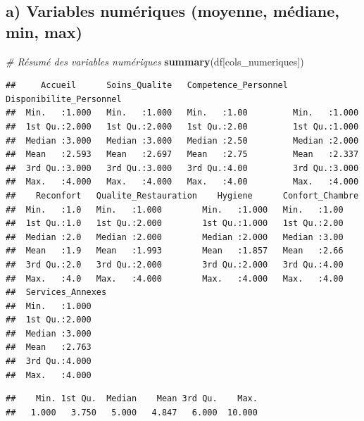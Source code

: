 \documentclass[
]{article}
\newenvironment{Shaded}{\begin{snugshade}}{\end{snugshade}}
\newcommand{\CommentTok}[1]{\textcolor[rgb]{0.56,0.35,0.01}{\textit{#1}}}
\newcommand{\FunctionTok}[1]{\textcolor[rgb]{0.13,0.29,0.53}{\textbf{#1}}}
\newcommand{\NormalTok}[1]{#1}
\newcommand{\SpecialCharTok}[1]{\textcolor[rgb]{0.81,0.36,0.00}{\textbf{#1}}}
\begin{document}
\subsection{a) Variables numériques (moyenne, médiane, min,
max)}\label{a-variables-numuxe9riques-moyenne-muxe9diane-min-max}

\begin{Shaded}
\begin{Highlighting}[]
\CommentTok{\# Résumé des variables numériques}
\FunctionTok{summary}\NormalTok{(df[cols\_numeriques])}
\end{Highlighting}
\end{Shaded}

\begin{verbatim}
##     Accueil      Soins_Qualite   Competence_Personnel Disponibilite_Personnel
##  Min.   :1.000   Min.   :1.000   Min.   :1.00         Min.   :1.000          
##  1st Qu.:2.000   1st Qu.:2.000   1st Qu.:2.00         1st Qu.:1.000          
##  Median :3.000   Median :3.000   Median :2.50         Median :2.000          
##  Mean   :2.593   Mean   :2.697   Mean   :2.75         Mean   :2.337          
##  3rd Qu.:3.000   3rd Qu.:3.000   3rd Qu.:4.00         3rd Qu.:3.000          
##  Max.   :4.000   Max.   :4.000   Max.   :4.00         Max.   :4.000          
##    Reconfort   Qualite_Restauration    Hygiene      Confort_Chambre
##  Min.   :1.0   Min.   :1.000        Min.   :1.000   Min.   :1.00   
##  1st Qu.:1.0   1st Qu.:2.000        1st Qu.:1.000   1st Qu.:2.00   
##  Median :2.0   Median :2.000        Median :2.000   Median :3.00   
##  Mean   :1.9   Mean   :1.993        Mean   :1.857   Mean   :2.66   
##  3rd Qu.:2.0   3rd Qu.:2.000        3rd Qu.:2.000   3rd Qu.:4.00   
##  Max.   :4.0   Max.   :4.000        Max.   :4.000   Max.   :4.00   
##  Services_Annexes
##  Min.   :1.000   
##  1st Qu.:2.000   
##  Median :3.000   
##  Mean   :2.763   
##  3rd Qu.:4.000   
##  Max.   :4.000
\end{verbatim}

\begin{Shaded}
\end{Shaded}

\begin{verbatim}
##    Min. 1st Qu.  Median    Mean 3rd Qu.    Max. 
##   1.000   3.750   5.000   4.847   6.000  10.000
\end{verbatim}
\end{document}
